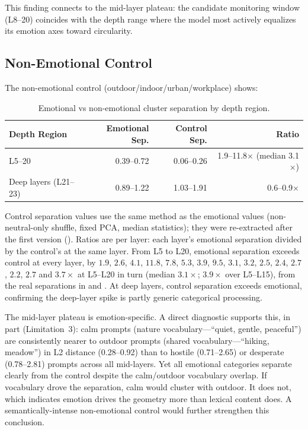 \documentclass[11pt,a4paper]{article}
\begin{document}
This finding connects to the mid-layer plateau: the candidate monitoring
window (L8--20) coincides with the depth range where the model most
actively equalizes its emotion axes toward circularity.

\subsection{Non-Emotional Control}
\label{sec:control}

The non-emotional control (outdoor/indoor/urban/workplace) shows:

\begin{table}[H]
\centering
\caption{Emotional vs non-emotional cluster separation by depth region.}
\label{tab:control}
\begin{tabular}{lrrr}
\toprule
Depth Region & Emotional Sep. & Control Sep. & Ratio \\
\midrule
L5--20  & 0.39--0.72 & 0.06--0.26 & 1.9--11.8$\times$ (median 3.1$\times$) \\
Deep layers (L21--23) & 0.89--1.22 & 1.03--1.91 & 0.6--0.9$\times$ \\
\bottomrule
\end{tabular}

\smallskip\noindent
Control separation values use the same method as the emotional values
(non-neutral-only shuffle, fixed PCA, median statistics); they were
re-extracted after the first version (). Ratios are per
layer: each layer's emotional separation divided by the control's at the
same layer. From L5 to L20, emotional separation exceeds control at every
layer, by $1.9$, $2.6$, $4.1$, $11.8$, $7.8$, $5.3$, $3.9$, $9.5$, $3.1$,
$3.2$, $2.5$, $2.4$, $2.7$, $2.2$, $2.7$ and $3.7\times$ at L5--L20 in turn
(median $3.1\times$; $3.9\times$ over L5--L15), from the real separations
in  and
. At deep
layers, control separation exceeds emotional, confirming the deep-layer
spike is partly generic categorical processing.
\end{table}

The mid-layer plateau is emotion-specific. A direct diagnostic supports
this, in part (Limitation~3): calm prompts (nature vocabulary---``quiet, gentle, peaceful'') are
consistently nearer to outdoor prompts (shared vocabulary---``hiking,
meadow'') in L2 distance (0.28--0.92) than to hostile (0.71--2.65) or
desperate (0.78--2.81) prompts across all mid-layers. Yet all emotional
categories separate clearly from the control despite the calm/outdoor
vocabulary overlap. If vocabulary drove the separation, calm would
cluster with outdoor. It does not, which indicates emotion drives the
geometry more than lexical content does. A semantically-intense non-emotional control would
further strengthen this conclusion.
\end{document}
